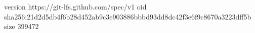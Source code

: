 version https://git-lfs.github.com/spec/v1
oid sha256:21d2d5db4f6b28d452ab9c3e903886bbbd93dd8dc42f3e6f9c8670a3223dff5b
size 399472
